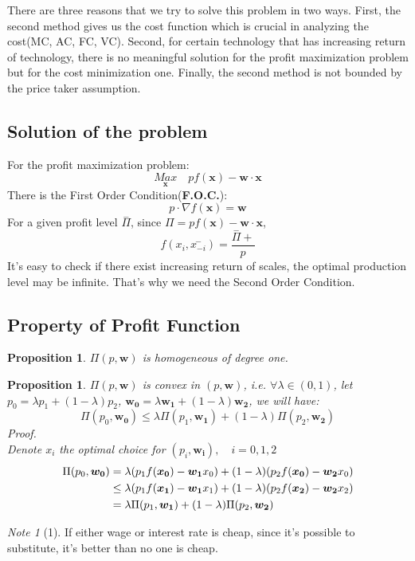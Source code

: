 \documentclass{book}
\theoremstyle{plain}
\newtheorem{prop}[thm]{Proposition}
\theoremstyle{definition}
\theoremstyle{remark}
\newtheorem*{note}{Note}
\begin{document}
There are three reasons that we try to solve this problem in two ways. First, the second method gives us the cost function which is crucial in analyzing the cost(MC, AC, FC, VC). Second, for certain technology that has increasing return of technology, there is no meaningful solution for the profit maximization problem but for the cost minimization one. Finally, the second method is not bounded by the price taker assumption.

\subsection{Solution of the problem}
For the profit maximization problem:
\begin{equation}
	\underset{\bm{x}}{Max}\quad p f(\bm{x}) - \bm{w}\cdot\bm{x}
\end{equation}
There is the First Order Condition({\bf F.O.C.}):
\begin{equation}
	p \cdot \nabla f(\bm{x})  = \bm{w}
\end{equation}
For a given profit level $\overset{-}{\Pi}$, since $\Pi = p f(\bm{x}) - \bm{w} \cdot \bm{x}$, 
\begin{equation}
	f(x_i,\overset{-}{x_{-i}}) = \frac{\overset{-}{\Pi}+}{p}
\end{equation} 
It's easy to check if there exist increasing return of scales, the optimal production level may be infinite. That's why we need the Second Order Condition. 
\subsection{Property of Profit Function}
\begin{prop}
$\Pi(p,\bm{w})$ is homogeneous of degree one.
\end{prop}
\begin{prop}
$\Pi(p,\bm{w})$ is convex in $(p,\bm{w})$, i.e. $\forall \lambda \in (0,1)$, let $p_0 = \lambda p_1 + (1-\lambda)p_2$, $\bm{w_0} = \lambda \bm{w_1} + (1-\lambda) \bm{w_2}$, we will have:
\begin{equation}
	\Pi(p_0,\bm{w_0})\leq \lambda \Pi(p_1,\bm{w_1}) + (1-\lambda)\Pi(p_2,\bm{w_2})
\end{equation}
Proof.\\
Denote $x_i$ the optimal choice for $(p_i,\bm{w_i}),\quad i = 0, 1, 2$ 
\begin{align} \notag
\Pi(p_0,\bm{w_0}) &= \lambda (p_1 f(\bm{x_0})-\bm{w_1}x_0) + (1-\lambda) (p_2 f(\bm{x_0})-\bm{w_2}x_0)\\ \notag
		& \leq \lambda (p_1 f(\bm{x_1}) -\bm{w_1}x_1) + (1-\lambda)(p_2 f(\bm{x_2})-\bm{w_2}x_2)\\ \notag
		& = \lambda \Pi(p_1,\bm{w_1}) + (1-\lambda)\Pi(p_2,\bm{w_2})
\end{align}
\end{prop}
\begin{note}[1]
If either wage or interest rate is cheap, since it's possible to substitute, it's better than no one is cheap.
\end{note}
\end{document}
